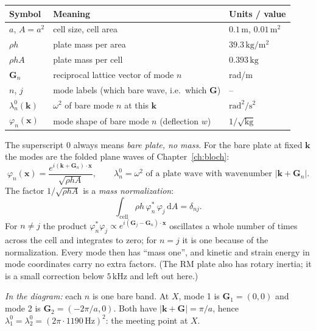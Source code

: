 \begin{center}
\begin{tabular}{|l|p{}|l|}
\hline
Symbol & Meaning & Units / value \\
\hline
$a$, $A = a^2$ & cell size, cell area & $0.1\,\mathrm{m}$, $0.01\,\mathrm{m^2}$ \\
$\rho h$ & plate mass per area & $39.3\,\mathrm{kg/m^2}$ \\
$\rho h A$ & plate mass per cell & $0.393\,\mathrm{kg}$ \\
$\mathbf{G}_n$ & reciprocal lattice vector of mode $n$ & rad/m \\
$n$, $j$ & mode labels (which bare wave, i.e.\ which $\mathbf{G}$) & -- \\
$\lambda_n^0(\mathbf{k})$ & $\omega^2$ of bare mode $n$ at this $\mathbf{k}$ & $\mathrm{rad^2/s^2}$ \\
$\varphi_n(\mathbf{x})$ & mode shape of bare mode $n$ (deflection $w$) & $1/\sqrt{\mathrm{kg}}$ \\
\hline
\end{tabular}
\end{center}
The superscript $0$ always means \emph{bare plate, no mass}. For the bare
plate at fixed $\mathbf{k}$ the modes are the folded plane waves of
Chapter~\ref{ch:bloch}:
\begin{equation}
  \varphi_n(\mathbf{x}) = \frac{e^{i(\mathbf{k} + \mathbf{G}_n)\cdot\mathbf{x}}}{\sqrt{\rho h A}},
  \qquad
  \lambda_n^0 = \omega^2 \text{ of a plate wave with wavenumber } |\mathbf{k} + \mathbf{G}_n| .
\end{equation}
The factor $1/\sqrt{\rho h A}$ is a \emph{mass normalization}:
\begin{equation}
  \int_\mathrm{cell} \rho h\, \varphi_n^*\, \varphi_j \,\mathrm{d}A = \delta_{nj} .
  \label{eq:orthonormal}
\end{equation}
For $n \neq j$ the product $\varphi_n^*\varphi_j \propto
e^{i(\mathbf{G}_j - \mathbf{G}_n)\cdot\mathbf{x}}$ oscillates a whole number of
times across the cell and integrates to zero; for $n = j$ it is one because of
the normalization. Every mode then has ``mass one'', and kinetic and strain
energy in mode coordinates carry no extra factors. (The RM plate also has
rotary inertia; it is a small correction below $5\,\mathrm{kHz}$ and left out
here.)

\emph{In the diagram:} each $n$ is one bare band. At $X$, mode 1 is
$\mathbf{G}_1 = (0,0)$ and mode 2 is $\mathbf{G}_2 = (-2\pi/a, 0)$. Both have
$|\mathbf{k} + \mathbf{G}| = \pi/a$, hence
$\lambda_1^0 = \lambda_2^0 = (2\pi \cdot 1190\,\mathrm{Hz})^2$: the meeting
point at $X$.

